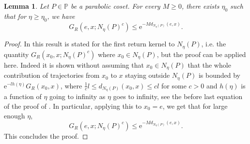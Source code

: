 \documentclass{amsart}
\newtheorem{lem}[thm]{Lemma}
\theoremstyle{definition}
\theoremstyle{remark}
\newcommand{\lw}[1]{{\color{cyan}{#1}}}
\begin{document}
\begin{lem}\label{lemmaexponentialmoments}
Let $P\in \mathbb P$ be a parabolic coset.
For every $M\geq 0$, there exists $\eta_0$ such that for $\eta\geq \eta_0$, we have
$$G_R(e,x;N_\eta(P)^c)\leq \mathrm{e}^{-Md_{N_\eta(P)}(e,x)}.$$
\end{lem}

\begin{proof}
In \cite[Lemma~4.6]{DG21} this result is stated for the first return kernel to $N_\eta(P)$, i.e. the quantity
$G_R(x_0,x;N_\eta(P)^c)$ where $x_0\in N_\eta(P)$, but the proof can be applied here.
Indeed it is shown without assuming that $x_0\in N_\eta(P)$ that the whole contribution of trajectories from $x_0$ to $x$ staying outside $N_\eta(P)$ is bounded by
$\mathrm{e}^{-l h(\eta)}G_R(x_0,x)$, where $\frac{1}{c}l\leq d_{N_\eta(P)}(x_0,x)\leq c l$ for some $c>0$ 
and $h(\eta)$ is a function of $\eta$ going to infinity as $\eta$ goes to infinity, see the before last equation of the proof of \cite[Lemma~4.6]{DG21}.
In particular, applying this to $x_0=e$, we get that for large enough $\eta$,
$$G_R(e,x;N_\eta(P)^c)\leq \mathrm{e}^{-M d_{N_\eta(P)}(e,x)}.$$
This concludes the proof.
\end{proof}

\end{document}
